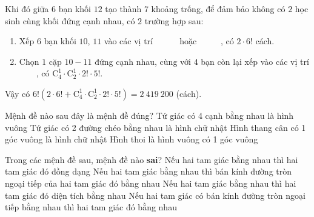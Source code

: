 \begin{ex}
{\begin{itemchoice}
\begin{center}
			\end{center}
			Khi đó giữa $6$ bạn khối $12$ tạo thành $7$ khoảng trống, để đảm bảo không có $2$ học sinh cùng  khối đứng cạnh nhau, có $2$ trường hợp sau:
			\begin{enumerate}
				\item [TH1.] Xếp $6$ bạn khối $10$, $11$ vào các vị trí {\color{teal}}\ {\color{teal}}\ {\color{teal}}\  {\color{teal}}\ {\color{teal}}\ {\color{teal}} hoặc {\color{teal}}\ {\color{teal}}\ {\color{teal}}\ {\color{teal}}\ {\color{teal}}\ {\color{teal}}, có $2\cdot 6!$ cách.
				\item [TH2.] Chọn $1$ cặp $10-11$ đứng cạnh nhau, cùng với $4$ bạn  còn lại xếp vào các vị trí {\color{teal}}\ {\color{teal}}\ {\color{teal}}\ {\color{teal}}\ {\color{teal}}, có $\mathrm{C}_4^1\cdot \mathrm{C}_2^1\cdot 2!\cdot 5!$.
			\end{enumerate}
			 Vậy có $6!\left(2\cdot 6!+\mathrm{C}_4^1\cdot \mathrm{C}_2^1\cdot 2!\cdot 5!\right)=2\ 419\ 200$ (cách).
		\end{itemchoice}
	 }
\end{ex}

\begin{ex}%
	 Mệnh đề nào sau đây là mệnh đề đúng?
	 \choice
		{Tứ giác có 4 cạnh bằng nhau là  hình vuông}
		{Tứ giác có 2 đường chéo bằng  nhau là hình chữ nhật}
		{\True Hình thang cân có 1  góc vuông là hình chữ nhật}
		{Hình thoi là hình vuông có 1 góc  vuông}
	\loigiai{ 
	 }
\end{ex}

\begin{ex}%
	Trong các mệnh đề sau, mệnh đề nào \textbf{sai}? 
	\choice 
		{Nếu hai  tam giác bằng nhau thì hai tam giác đó đồng dạng}
		{Nếu hai tam giác bằng nhau thì bán kính đường tròn ngoại tiếp của hai tam giác đó bằng  nhau}
		{Nếu hai tam giác  bằng nhau thì hai tam giác đó diện tích bằng nhau}
		{\True  Nếu hai tam giác có bán kính đường tròn ngoại tiếp bằng nhau thì hai tam giác đó bằng nhau}
\end{ex}

